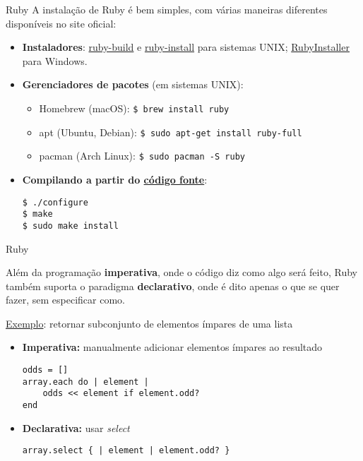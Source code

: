 \documentclass{beamer}
\begin{document}
\begin{frame}[fragile]{Ruby}
A instalação de Ruby é bem simples, com várias maneiras diferentes disponíveis no site oficial:

\begin{itemize}
\item \textbf{Instaladores}: \href{https://github.com/rbenv/ruby-build}{ruby-build} e \href{https://github.com/postmodern/ruby-install}{ruby-install} para sistemas UNIX; \href{https://rubyinstaller.org/}{RubyInstaller} para Windows.

\item \textbf{Gerenciadores de pacotes} (em sistemas UNIX):

\begin{itemize}
\item Homebrew (macOS): \verb|$ brew install ruby|
\item apt (Ubuntu, Debian): \verb|$ sudo apt-get install ruby-full|
\item pacman (Arch Linux): \verb|$ sudo pacman -S ruby|
\end{itemize}

\item \textbf{Compilando a partir do \href{https://www.ruby-lang.org/en/downloads/}{código fonte}}:
\begin{verbatim}
$ ./configure
$ make
$ sudo make install
\end{verbatim}

\end{itemize}


\end{frame}


\begin{frame}[fragile]{Ruby}

Além da programação \textbf{imperativa}, onde o código diz como algo será feito, Ruby também suporta o paradigma \textbf{declarativo}, onde é dito apenas o que se quer fazer, sem especificar como.

\underline{Exemplo}: retornar subconjunto de elementos ímpares de uma lista

\begin{itemize}
\item \textbf{Imperativa:} manualmente adicionar elementos ímpares ao resultado

\begin{verbatim}
odds = []
array.each do | element |
    odds << element if element.odd?
end
\end{verbatim}

\item \textbf{Declarativa:} usar \textit{select}
\begin{verbatim}
array.select { | element | element.odd? }
\end{verbatim}

\end{itemize}

\end{frame}
\end{document}
